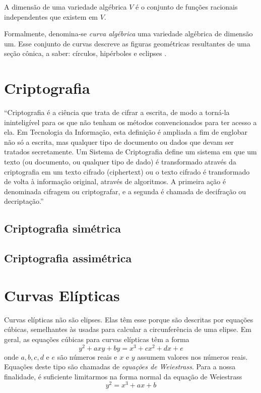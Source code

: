A dimensão de uma variedade algébrica \(V\)  é o conjunto de funções racionais independentes que existem em \(V\).
\par Formalmente,  denomina-se \textit{curva algébrica} uma variedade algébrica de dimensão um. Esse conjunto de curvas descreve as figuras geométricas resultantes de uma seção cônica, a saber: círculos, hipérboles e eclipses \cite{Thomas:2004}.

%
%
\section{Criptografia} \label{sec:criptografia}
``Criptografia é a ciência que trata de cifrar a escrita, de modo a torná-la ininteligível para os que não tenham os métodos convencionados para ter acesso a ela. Em Tecnologia da Informação, esta definição é ampliada a fim de englobar não só a escrita, mas qualquer tipo de documento ou dados que devam ser tratados secretamente. Um Sistema de Criptografia define um sistema em que um texto (ou documento, ou qualquer tipo de dado) é transformado através da criptografia em um texto cifrado (ciphertext) ou o texto cifrado é transformado de volta à informação original, através de algoritmos. A primeira ação é denominada cifragem ou criptografar, e a segunda é chamada de decifração ou decriptação.'' \cite{Portnoi:2005}

%
%
\subsection{Criptografia simétrica}

%
%
\subsection{Criptografia assimétrica}

%
%
\section{Curvas Elípticas}
Curvas elípticas não são elipses. Elas têm esse porque são descritas por equações cúbicas, semelhantes às usadas para calcular a circunferência de uma elipse. Em geral, as equações cúbicas para curvas elípticas têm a forma
\begin{equation}
y^2 + axy + by = x^3 + cx^2 + dx + e \label{eq:11}
\end{equation}
onde \(a, b, c, d\) e \(e\) são números reais e \(x\) e \(y\) assumem valores nos números reais. Equações deste tipo são chamadas de \textit{equações de Weiestrass}. Para a nossa finalidade, é suficiente limitarmos na forma normal da equação de Weiestrass
\begin{equation}
y^2 = x^3 + ax + b \label{eq:12}
\end{equation}

